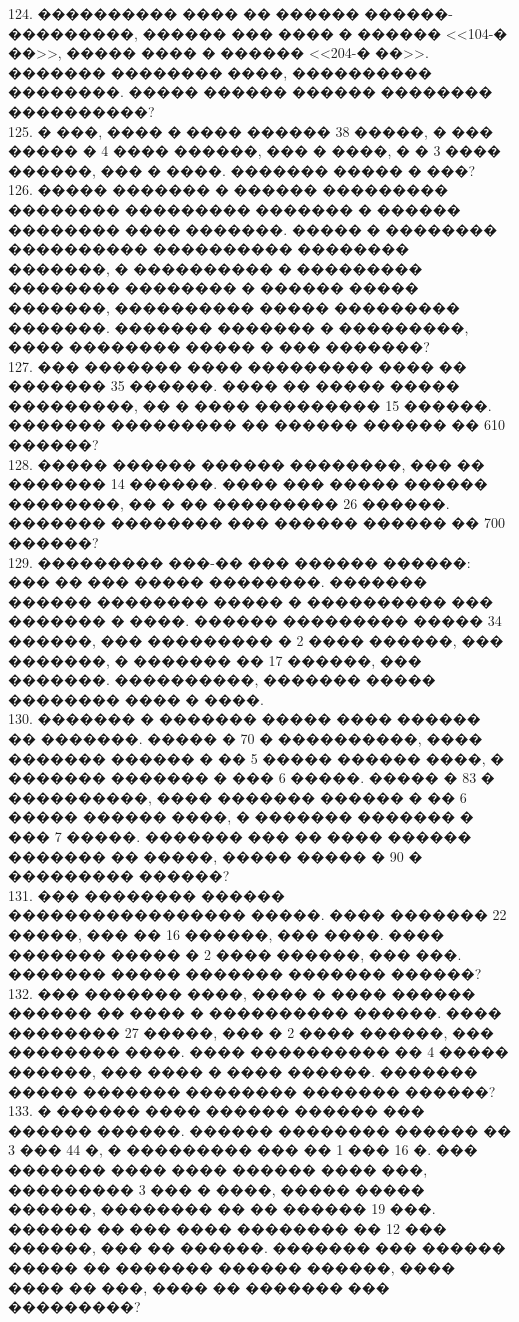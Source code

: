 \documentclass[12pt]{article}
\begin{document}
124. ���������� ���� �� ������ ������-���������, ������ ��� ���� � ������ <<104-� ��>>, ����� ���� � ������ <<204-� ��>>. ������� �������� ����, ���������� ��������. ����� ������ ������ �������� ����������?\\
125. � ���, ���� � ���� ������ 38 �����, � ��� ����� � 4 ���� ������, ��� � ����, � � 3 ���� ������, ��� � ����. ������� ����� � ���?\\
126. ����� ������� � ������ ��������� �������� ��������� ������� � ������ �������� ���� �������. ����� � �������� ���������� ���������� �������� �������, � ���������� � ��������� �������� �������� � ������ ����� �������, ���������� ����� ��������� �������. ������� ������� � ���������, ���� �������� ����� � ��� �������?\\
127. ��� ������� ���� ��������� ���� �� ������� 35 ������. ���� �� ����� ����� ���������, �� � ���� ��������� 15 ������. ������� ��������� �� ������ ������ �� 610 ������?\\
128. ����� ������ ������ ��������, ��� �� ������� 14 ������. ���� ��� ����� ������ ��������, �� � �� ��������� 26 ������. ������� �������� ��� ������ ������ �� 700 ������?\\
129. ��������� ���-�� ��� ������ ������: ��� �� ��� ����� ��������. ������� ������ �������� ����� � ���������� ��� ������� � ����. ������ ��������� ����� 34 ������, ��� ��������� � 2 ���� ������, ��� �������, � ������� �� 17 ������, ��� �������. ����������, ������� ����� �������� ���� � ����.\\
130. ������� � ������� ����� ���� ������ �� �������. ����� � 70 � ����������, ���� ������� ������ � �� 5 ����� ������ ����, � ������� ������� � ��� 6 �����.
����� � 83 � ����������, ���� ������� ������ � �� 6 ����� ������ ����, � ������� ������� � ��� 7 �����. ������� ��� �� ���� ������ ������� �� �����, ����� ����� � 90 � ��������� ������?\\
131. ��� �������� ������ ����������������� �����. ���� ������� 22 �����, ��� �� 16 ������, ��� ����. ���� ������� ����� � 2 ���� ������, ��� ���. ������� ����� ������� ������� ������?\\
132. ��� ������� ����, ���� � ���� ������ ������ �� ���� � ���������� ������. ���� �������� 27 �����, ��� � 2 ���� ������, ��� �������� ����. ���� ���������� �� 4 ����� ������, ��� ���� � ���� ������. ������� ����� ������� �������� ������� ������?\\
133. � ������ ���� ������ ������ ��� ������ ������. ������ �������� ������ �� 3 ��� 44 �, � ��������� ��� �� 1 ��� 16 �. ��� ������� ���� ���� ������ ���� ���, ��������� 3 ��� � ����, ����� ����� ������, �������� �� �� ������ 19 ���. ������ �� ��� ���� �������� �� 12 ��� ������, ��� �� ������. ������� ��� ������ ����� �� ������� ������ ������, ���� ���� �� ���, ���� �� ������� ��� ���������?\\
\end{document}
